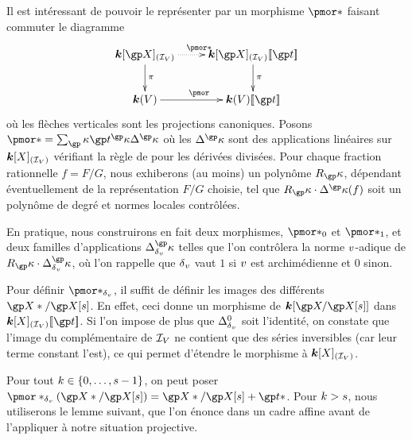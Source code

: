 Il est intéressant de pouvoir le représenter par un morphisme \( \pmor* \)
faisant commuter le diagramme
\begin{equation} \label{e:pmor}
  \begin{aligned}[c]
    \xymatrix{
      \cdn[\vp]_{(\ideal\anyvar)}               \ar[d]^\pi \ar@{.>}[r]^{\pmor*}
      & \cdn[\vp]_{(\ideal\anyvar)} \series\psp \ar[d]^\pi
      \\ \cdn(\anyvar)                                     \ar[r]^{\pmor}
      & \cdn(\anyvar)\series\psp
    }
  \end{aligned}
\end{equation}
où les flèches verticales sont les projections canoniques. Posons
\( \pmor* = \sum_\derp \psp^\derp \pdiff*^\derp \) où les \( \pdiff*^\derp \)
sont des applications linéaires sur \( {\boldsymbol k}[X]_{(\mathcal I\sb{V})} \) vérifiant
la règle de  pour les dérivées divisées. Pour chaque fraction
rationnelle \( f = F/G \), nous exhiberons (au moins) un polynôme \( R_\derp
\), dépendant éventuellement de la représentation \( F/G \) choisie, tel que
\( R_\derp \cdot \pdiff*^\derp(f) \) soit un polynôme de degré et normes
locales contrôlées.

En pratique, nous construirons en fait deux morphismes, \( \pmor*_0 \) et \(
  \pmor*_1 \), et deux familles d'applications \( \pdiff^\derp \) telles que
l'on contrôlera la norme \( v \)-adique de \( R_\derp \cdot \pdiff^\derp
\), où l'on rappelle que \( {\delta\smash{\sb v}} \) vaut \( 1 \) si \( v \) est
archimédienne et \( 0 \) sinon.

Pour définir \( \pmor*_\dv \), il suffit de définir les images des différents
\( \vp* / \vp[\anydim] \). En effet, ceci donne un morphisme de \( \cdn[ \vp /
  \vp[\anydim] ] \) dans \( \cdn[X]_{(\ideal\anyvar)} \series\psp \). Si l'on
impose de plus que \( \pdiff^0 \) soit l'identité, on constate que l'image du
complémentaire de \( \mathcal I\sb{V} \) ne contient que des séries inversibles
(car leur terme constant l'est), ce qui permet d'étendre le morphisme à \(
  {\boldsymbol k}[X]_{(\mathcal I\sb{V})} \).

Pour tout \( k \in \lbrace0, \dots, s-1\rbrace \), on peut poser \(
  \pmor*_\dv(\vp*/\vp[\anydim]) = \vp*/\vp[\anydim] + \psp* \). Pour \( k >
  s \), nous utiliserons le lemme suivant, que l'on énonce dans un cadre
affine avant de l'appliquer à notre situation projective.

